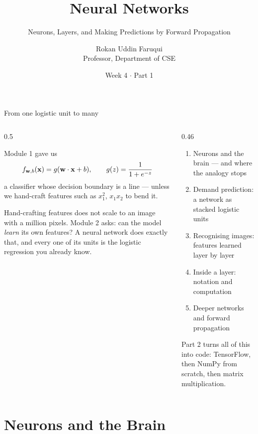 \documentclass[aspectratio=169,10pt]{beamer}
\title[CSE 815 -- Week 4, Part 1]{Neural Networks}
\subtitle{Neurons, Layers, and Making Predictions by Forward Propagation}
\author{Rokan Uddin Faruqui\\ \small Professor, Department of CSE}
\institute{\small University of Chittagong \\ \texttt{rufaruqui@cu.ac.bd}}
\date[Week 4 / Part 1]{Week 4 $\cdot$ Part 1}
\begin{document}
\begin{frame}
  \titlepage
\end{frame}

\begin{frame}{From one logistic unit to many}
  \begin{columns}[T,onlytextwidth]
    \begin{column}{0.5\textwidth}
      \begin{block}{Module 1 gave us}
        \[ f_{\mathbf{w},b}(\mathbf{x})=g(\mathbf{w}\cdot\mathbf{x}+b),\qquad g(z)=\frac{1}{1+e^{-z}} \]
        a classifier whose decision boundary is a line --- unless we hand-craft features such
        as $x_1^2$, $x_1x_2$ to bend it.
      \end{block}
      \footnotesize
      Hand-crafting features does not scale to an image with a million pixels. Module 2 asks:
      can the model \emph{learn} its own features? A neural network does exactly that, and
      every one of its units is the logistic regression you already know.
    \end{column}
    \begin{column}{0.46\textwidth}
      \begin{keyidea}[Today]
        \footnotesize
        \begin{enumerate}
          \item Neurons and the brain --- and where the analogy stops
          \item Demand prediction: a network as stacked logistic units
          \item Recognising images: features learned layer by layer
          \item Inside a layer: notation and computation
          \item Deeper networks and forward propagation
        \end{enumerate}
      \end{keyidea}
      \footnotesize Part 2 turns all of this into code: TensorFlow, then NumPy from scratch,
      then matrix multiplication.
    \end{column}
  \end{columns}
\end{frame}

\section{Neurons and the Brain}
\end{document}
